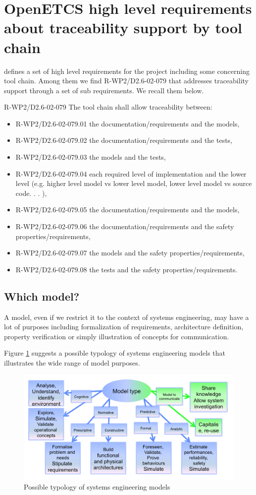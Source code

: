 \documentclass[11pt]{template/openetcs_report}
\begin{document}
\section{OpenETCS high level requirements about traceability support by tool chain}
\cite{D2.6.9} defines a set of high level requirements for the project including some concerning tool chain. Among them we find R-WP2/D2.6-02-079 that addresses traceability support through a set of sub requirements. We recall them below.

R-WP2/D2.6-02-079 The tool chain shall allow traceability between:
\begin{itemize}
\item R-WP2/D2.6-02-079.01 the documentation/requirements and the models,
\item R-WP2/D2.6-02-079.02 the documentation/requirements and the tests,
\item R-WP2/D2.6-02-079.03 the models and the tests,
\item R-WP2/D2.6-02-079.04 each required level of implementation and the lower level (e.g. higher
level model vs lower level model, lower level model vs source code. . . ),
\item R-WP2/D2.6-02-079.05 the documentation/requirements and the models,
\item R-WP2/D2.6-02-079.06 the documentation/requirements and the safety properties/requirements,
\item R-WP2/D2.6-02-079.07 the models and the safety properties/requirements,
\item R-WP2/D2.6-02-079.08 the tests and the safety properties/requirements.
\end{itemize}

\subsection{Which model?}
A model, even if we restrict it to the context of systems engineering,  may have a lot of purposes including formalization of requirements, architecture definition, property verification or simply illustration of concepts for communication. 

Figure \ref{fig:TypologyOfSystemsEngineeringModels} suggests a possible typology of systems engineering models that illustrates the wide range of model purposes.

\begin{figure}[htbp]
\centering
\includegraphics[width=.9\linewidth]
{./images/TypologyOfSystemsEngineeringModels.png}
\caption{\label{fig:TypologyOfSystemsEngineeringModels}Possible typology of systems engineering models}
\end{figure}
\end{document}
